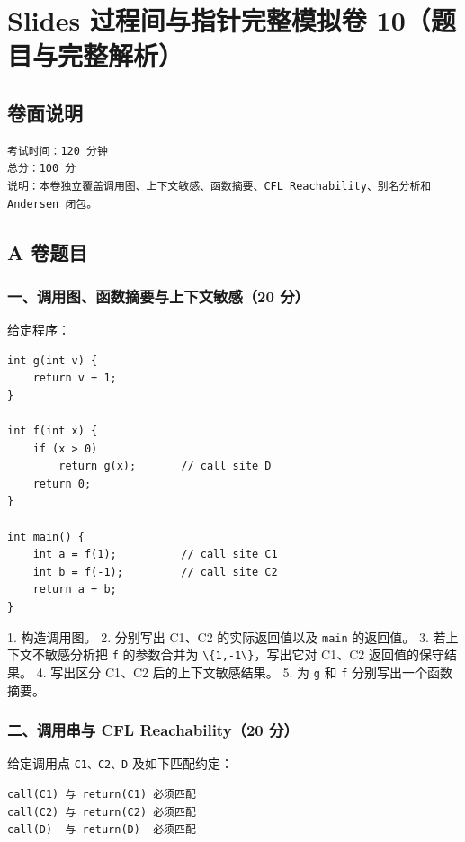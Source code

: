 \documentclass[UTF8]{ctexart}
\begin{document}
\section*{Slides 过程间与指针完整模拟卷 10（题目与完整解析）}

\subsection*{卷面说明}

\begin{Verbatim}[fontsize=\small,breaklines=true]
考试时间：120 分钟
总分：100 分
说明：本卷独立覆盖调用图、上下文敏感、函数摘要、CFL Reachability、别名分析和 Andersen 闭包。
\end{Verbatim}

\subsection*{A 卷题目}

\subsubsection*{一、调用图、函数摘要与上下文敏感（20 分）}

给定程序：

\begin{Verbatim}[fontsize=\small,breaklines=true]
int g(int v) {
    return v + 1;
}

int f(int x) {
    if (x > 0)
        return g(x);       // call site D
    return 0;
}

int main() {
    int a = f(1);          // call site C1
    int b = f(-1);         // call site C2
    return a + b;
}
\end{Verbatim}

1. 构造调用图。 2. 分别写出 C1、C2 的实际返回值以及 \texttt{main} 的返回值。 3. 若上下文不敏感分析把 \texttt{f} 的参数合并为 \texttt{\textbackslash{}\{1,-1\textbackslash{}\}}，写出它对 C1、C2 返回值的保守结果。 4. 写出区分 C1、C2 后的上下文敏感结果。 5. 为 \texttt{g} 和 \texttt{f} 分别写出一个函数摘要。

\subsubsection*{二、调用串与 CFL Reachability（20 分）}

给定调用点 \texttt{C1、C2、D} 及如下匹配约定：

\begin{Verbatim}[fontsize=\small,breaklines=true]
call(C1) 与 return(C1) 必须匹配
call(C2) 与 return(C2) 必须匹配
call(D)  与 return(D)  必须匹配
\end{Verbatim}
\end{document}
